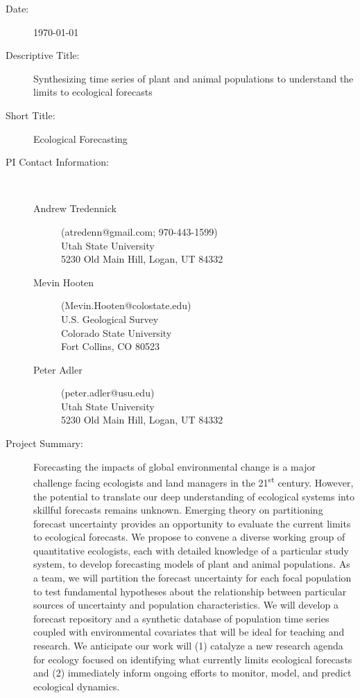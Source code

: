 \documentclass[12pt,]{article}
\title{}
\author{}
\date{}
\begin{document}
\newcommand{\new}{\textcolor{blue}}


\begin{description}
\item[Date:] \today
\item[Descriptive Title:] Synthesizing time series of plant and animal populations to understand the limits to ecological forecasts
\item[Short Title:] Ecological Forecasting
\item[PI Contact Information:] ~\\
\vspace{-1.5em}
\begin{description}
 \item[\textcolor{mycol}{Andrew Tredennick}] (atredenn@gmail.com; 970-443-1599) \\ Utah State University \\ 5230 Old Main Hill, Logan, UT 84332
 \item[\textcolor{mycol}{Mevin Hooten}] (Mevin.Hooten@colostate.edu) \\ U.S. Geological Survey \\ Colorado State University \\ Fort Collins, CO 80523
 \item[\textcolor{mycol}{Peter Adler}] (peter.adler@usu.edu) \\ Utah State University \\ 5230 Old Main Hill, Logan, UT 84332
\end{description}
\item[Project Summary:] Forecasting the impacts of global environmental change is a major challenge facing ecologists and land managers in the 21\textsuperscript{st} century. However, the potential to translate our deep understanding of ecological systems into skillful forecasts remains unknown. Emerging theory on partitioning forecast uncertainty provides an opportunity to evaluate the current limits to ecological forecasts. We propose to convene a diverse working group of quantitative ecologists, each with detailed knowledge of a particular study system, to develop forecasting models of plant and animal populations. As a team, we will partition the forecast uncertainty for each focal population to test fundamental hypotheses about the relationship between particular sources of uncertainty and population characteristics. We will develop a forecast repository and a synthetic database of population time series coupled with environmental covariates that will be ideal for teaching and research. We anticipate our work will (1) catalyze a new research agenda for ecology focused on identifying what currently limits ecological forecasts and (2) immediately inform ongoing efforts to monitor, model, and predict ecological dynamics.

\end{description}
\end{document}
